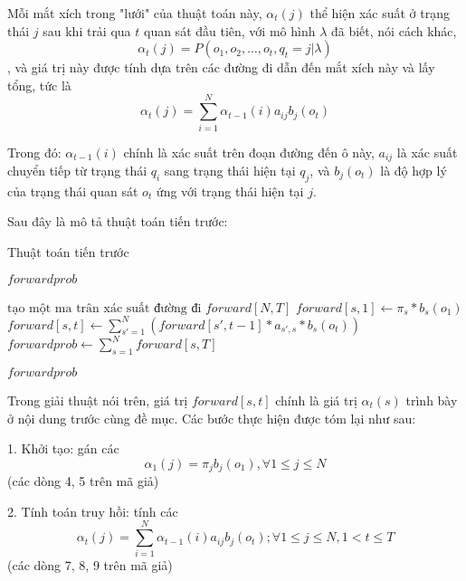 Mỗi mắt xích trong "lưới" của thuật toán này, \(\alpha_t(j)\) thể hiện xác suất ở trạng thái \(j\) sau khi trải qua \(t\) quan sát đầu tiên, với mô hình \(\lambda\) đã biết, nói cách khác, \[\alpha_t(j) = P(o_1,o_2,\ldots,o_t,q_t = j|\lambda)\], và giá trị này được tính dựa trên các đường đi dẫn đến mắt xích này và lấy tổng, tức là \[\alpha_t(j) = \displaystyle\sum_{i=1}^{N}\alpha_{t-1}(i)a_{ij}b_j(o_t)\]

Trong đó: \(\alpha_{t-1}(i)\) chính là xác suất trên đoạn đường đến ô này, \(a_{ij}\) là xác suất chuyển tiếp từ trạng thái \(q_i\) sang trạng thái hiện tại \(q_j\), và \(b_j(o_t)\) là độ hợp lý của trạng thái quan sát \(o_t\) ứng với trạng thái hiện tại \(j\).

Sau đây là mô tả thuật toán tiến trước:

\begin{breakablealgorithm}
  \caption{Thuật toán tiến trước}
  \begin{algorithmic}[1]
     \Return $forwardprob$

    \State $\text{tạo một ma trân xác suất đường đi } forward[N, T]$
    \State {}
        \State $forward[s,1] \gets \pi_s * b_s \left( {o_1} \right)$
        \State {}
     \EndFor
        	\State $forward[s, t] \gets \displaystyle\sum_{s' = 1}^N \left( {forward\left[ {s',t - 1} \right]*{a_{s',s}}*{b_s}\left( {{o_t}} \right)} \right)$
        \EndFor
      \EndFor
      \State $forwardprob \gets \displaystyle\sum_{s = 1}^N forward[s,T]$
     \State {}

    \Return $forwardprob$
    \EndFunction
  \end{algorithmic}
\end{breakablealgorithm}

Trong giải thuật nói trên, giá trị \(forward[s,t]\) chính là giá trị \(\alpha_t(s)\) trình bày ở nội dung trước cùng đề mục. Các bước thực hiện được tóm lại như sau:

1. Khởi tạo: gán các \[\alpha_1(j) = \pi_jb_j(o_1),\forall 1\le j\le N\] (các dòng 4, 5 trên mã giả)

2. Tính toán truy hồi: tính các \[\alpha_t(j) = \displaystyle\sum_{i=1}^{N}\alpha_{t-1}(i)a_{ij}b_j(o_t); \forall 1\le j\le N, 1<t\le T\] (các dòng 7, 8, 9 trên mã giả)


